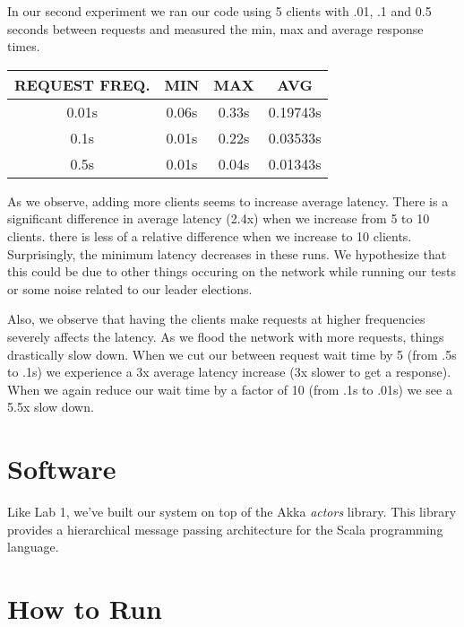 \documentclass[11pt]{article}
\begin{document}
In our second experiment we ran our code using 5 clients with .01, .1
and 0.5 seconds between requests and measured the min, max and
average response times.

\begin{tabular}{c|c|c|c}
  REQUEST FREQ. & MIN & MAX & AVG \\
  \hline
  0.01s & 0.06s & 0.33s & 0.19743s \\
  0.1s  & 0.01s & 0.22s & 0.03533s \\
  0.5s  & 0.01s & 0.04s & 0.01343s \\
\end{tabular}

As we observe, adding more clients seems to increase average latency.
There is a significant difference in average latency (2.4x) when we
increase from 5 to 10 clients.  there is less of a relative difference
when we increase to 10 clients. Surprisingly, the minimum latency
decreases in these runs. We hypothesize that this could be due to
other things occuring on the network while running our tests or some
noise related to our leader elections.

Also, we observe that having the clients make requests at higher
frequencies severely affects the latency.  As we flood the network
with more requests, things drastically slow down.  When we cut our
between request wait time by 5 (from .5s to .1s) we experience a 3x
average latency increase (3x slower to get a response).  When we again
reduce our wait time by a factor of 10 (from .1s to .01s) we see a
5.5x slow down.

\section{Software}
Like Lab 1, we've built our system on top of the Akka \emph{actors}
library.  This library provides a hierarchical message passing
architecture for the Scala programming language.

\section{How to Run}
\end{document}
